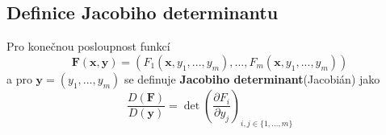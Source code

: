 \documentclass[../main.tex]{subfiles}
\begin{document}
\subsection{Definice Jacobiho determinantu}
\hspace{1.2mm}
\noindent
Pro konečnou posloupnost funkcí
\[ \mathbf{F}(\mathbf{x}, \mathbf{y}) =
(F_1(\mathbf{x}, y_1, ..., y_m), ... , F_m(\mathbf{x}, y_1, ..., y_m)) \]
a pro $\mathbf{y} = (y_1, ... , y_m)$ se definuje \textbf{Jacobiho determinant}(Jacobián) jako
\[ \frac{D(\mathbf{F})}{D(\mathbf{y})} =
\det \left( \frac{\partial F_i}{\partial y_j} \right)_{i,j \in \{ 1, ... , m\}} \]
\end{document}
